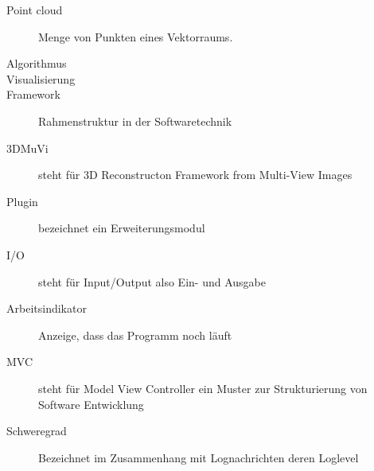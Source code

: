 
\begin{description}
	\item[Point cloud] Menge von Punkten eines Vektorraums.
	\item[Algorithmus]
	\item[Visualisierung]
	\item[Framework] Rahmenstruktur in der Softwaretechnik 
	\item[3DMuVi] steht für 3D Reconstructon Framework from Multi-View Images
	\item[Plugin] bezeichnet ein Erweiterungsmodul 
	\item[I/O] steht für Input/Output also Ein- und Ausgabe
	\item[Arbeitsindikator] Anzeige, dass das Programm noch läuft 
	\item[MVC]steht für Model View Controller ein Muster zur Strukturierung von Software Entwicklung
	\item[Schweregrad] Bezeichnet im Zusammenhang mit Lognachrichten deren Loglevel
\end{description}
